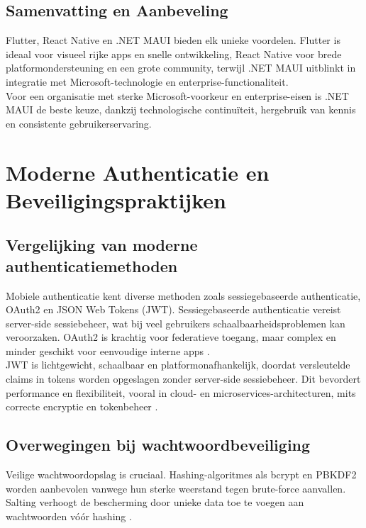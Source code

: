 \subsection{Samenvatting en Aanbeveling}
Flutter, React Native en .NET MAUI bieden elk unieke voordelen. Flutter is ideaal voor visueel rijke apps en snelle ontwikkeling, React Native voor brede platformondersteuning en een grote community, terwijl .NET MAUI uitblinkt in integratie met Microsoft-technologie en enterprise-functionaliteit.\\

Voor een organisatie met sterke Microsoft-voorkeur en enterprise-eisen is .NET MAUI de beste keuze, dankzij technologische continuïteit, hergebruik van kennis en consistente gebruikerservaring.

\section{Moderne Authenticatie en Beveiligingspraktijken}

\subsection{Vergelijking van moderne authenticatiemethoden}
Mobiele authenticatie kent diverse methoden zoals sessiegebaseerde authenticatie, OAuth2 en JSON Web Tokens (JWT). Sessiegebaseerde authenticatie vereist server-side sessiebeheer, wat bij veel gebruikers schaalbaarheidsproblemen kan veroorzaken. OAuth2 is krachtig voor federatieve toegang, maar complex en minder geschikt voor eenvoudige interne apps \autocite{Gao2023}.\\

JWT is lichtgewicht, schaalbaar en platformonafhankelijk, doordat versleutelde claims in tokens worden opgeslagen zonder server-side sessiebeheer. Dit bevordert performance en flexibiliteit, vooral in cloud- en microservices-architecturen, mits correcte encryptie en tokenbeheer \autocite{Gao2023}.

\subsection{Overwegingen bij wachtwoordbeveiliging}
Veilige wachtwoordopslag is cruciaal. Hashing-algoritmes als bcrypt en PBKDF2 worden aanbevolen vanwege hun sterke weerstand tegen brute-force aanvallen. Salting verhoogt de bescherming door unieke data toe te voegen aan wachtwoorden vóór hashing \autocite{Gupta2022, Arias2025}.\\

